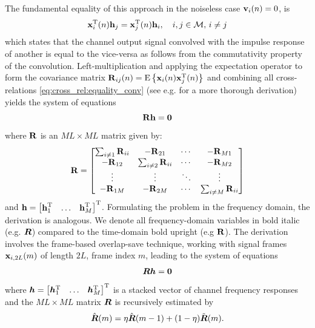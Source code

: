 \documentclass{article}
\begin{document}
The fundamental equality of this approach in the noiseless case \(\bm{\mathrm{v}}_i(n) = 0\), is 
\begin{equation}
    \bm{\mathrm{x}}_i^{{\mathrm{T}}}(n) \bm{\mathrm{h}}_j = \bm{\mathrm{x}}_j^{{\mathrm{T}}}(n) \bm{\mathrm{h}}_i,\quad i,j \in \mathcal{M},\,i\neq j\label{eq:cross_rel:equality_conv}
\end{equation}
which states that the channel output signal convolved with the impulse response of another is equal to the vice-versa as follows from the commutativity property of the convolution.
Left-multiplication and applying the expectation operator to form the covariance matrix \(\bm{\mathrm{R}}_{ij}(n) = \mathrm{E} \left\lbrace \bm{\mathrm{x}}_i(n) \bm{\mathrm{x}}_j^{\mathrm{T}}(n) \right\rbrace\) and combining all cross-relations \eqref{eq:cross_rel:equality_conv} (see e.g. \cite{huangAdaptiveMultichannelLeast2002} for a more thorough derivation) yields the system of equations  
\begin{equation}
    \bm{\mathrm{R}} \bm{\mathrm{h}} = \bm{0} \label{eq:cross_rel:null_space}\\
\end{equation}
where \(\bm{\mathrm{R}}\) is an \(M L \times M L\) matrix given by:
\begin{equation}
    \bm{\mathrm{R}} = \begin{bmatrix}
        \sum_{i \neq 1} \bm{\mathrm{R}}_{ii} & -\bm{\mathrm{R}}_{21} & \cdots & -\bm{\mathrm{R}}_{M1}\\
        -\bm{\mathrm{R}}_{12} & \sum_{i \neq 2} \bm{\mathrm{R}}_{ii} & \cdots & -\bm{\mathrm{R}}_{M2}\\
        \vdots & \vdots & \ddots & \vdots\\
        -\bm{\mathrm{R}}_{1M} & -\bm{\mathrm{R}}_{2M} & \cdots & \sum_{i \neq M} \bm{\mathrm{R}}_{ii}\\
    \end{bmatrix}\label{eq:cross_rel:data_matrix}
\end{equation}
and \(\bm{\mathrm{h}} = \begin{bmatrix}
    \bm{\mathrm{h}}_1^{\mathrm{T}} & \ldots & \bm{\mathrm{h}}_M^{\mathrm{T}}
\end{bmatrix}^{\mathrm{T}}\).
Formulating the problem in the frequency domain, the derivation is analogous. We denote all frequency-domain variables in bold italic (e.g. \({\bm{{R}}}\)) compared to the time-domain bold upright (e.g \(\bm{\mathrm{R}}\)). The derivation involves the frame-based overlap-save technique, working with signal frames \(\bm{\mathrm{x}}_{i,2L}(m)\) of length \(2L\), frame index \(m\), leading to the system of equations 
\begin{equation}
    {\bm{{R}}} {\bm{h}} = \bm{0} \label{eq:frequency_domain:null_space}\\
\end{equation}
where \({\bm{h}} = \begin{bmatrix}
    {\bm{h}}_1^{\mathrm{T}} & \ldots & {\bm{h}}_M^{\mathrm{T}}
\end{bmatrix}^{\mathrm{T}} \) is a stacked vector of channel frequency responses and the \(M L \times M L\) matrix \({\bm{{R}}}\) is recursively estimated by \begin{equation}
    \hat{{\bm{{R}}}}(m) = \eta \hat{{\bm{{R}}}}(m-1) + (1-\eta )\tilde{{\bm{{R}}}}(m).
\end{equation}
\end{document}
